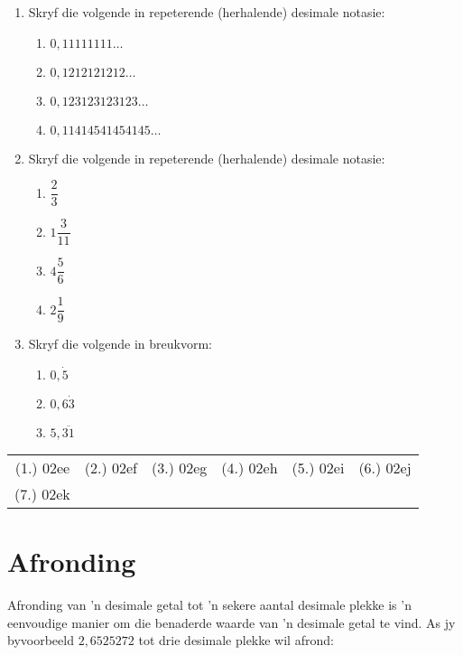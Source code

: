 \begin{exercises}{}
{\begin{enumerate}[itemsep=5pt, label=\textbf{\arabic*}. ]
\item Skryf die volgende in repeterende (herhalende) desimale notasie:
    \begin{enumerate}[itemsep=5pt, label=\textbf{\alph*}. ] 
    \item $0,11111111\ldots$
    \item $0,1212121212\ldots$
    \item $0,123123123123\ldots$
    \item $0,11414541454145\ldots$
    \end{enumerate}
\item Skryf die volgende in repeterende (herhalende) desimale notasie:
    \begin{enumerate}[itemsep=5pt, label=\textbf{\alph*}. ] 
    \item $\dfrac{2}{3}$
    \item $1\dfrac{3}{11}$
    \item $4\dfrac{5}{6}$
    \item $2\dfrac{1}{9}$
    \end{enumerate}
\item Skryf die volgende in breukvorm:
    \begin{enumerate}[itemsep=5pt, label=\textbf{\alph*}. ] 
    \item $0,\dot{5}$
    \item $0,6\dot{3}$
    \item $5,\overline{31}$
    \end{enumerate}
\end{enumerate}

\par \practiceinfo
\par \begin{tabular}[h]{cccccc}
(1.)	02ee	&
(2.)	02ef	&
(3.)	02eg	&
(4.)	02eh	&
(5.)	02ei	&
(6.)	02ej	\\ %
(7.)	02ek	&
\end{tabular}
}
\end{exercises}

\section{Afronding}

Afronding van ’n desimale getal tot ’n sekere aantal desimale plekke is ’n eenvoudige manier om die benaderde waarde van ’n desimale getal te vind. As jy byvoorbeeld $2,6525272$  tot drie desimale plekke wil afrond:

